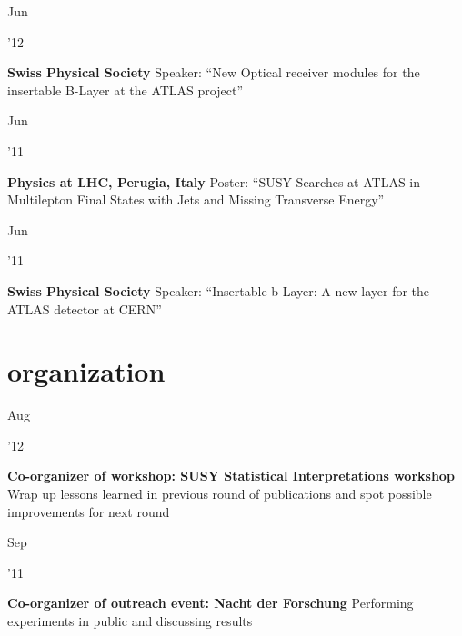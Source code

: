 \documentclass[]{cv} %
\begin{document}
\begin{entrylist}
  \entry
  {\parbox[t]{\parboxWidthOne}{Jun}\parbox[t]{\parboxWidthTwo}{\hfill '12}}
  {\textbf{Swiss Physical Society}}
  {}
  {Speaker: ``New Optical receiver modules for the insertable B-Layer at the ATLAS project''}

  \entry
  {\parbox[t]{\parboxWidthOne}{Jun}\parbox[t]{\parboxWidthTwo}{\hfill '11}}
  {\textbf{Physics at LHC, Perugia, Italy}}
  {}
  {Poster: ``SUSY Searches at ATLAS in Multilepton Final States with Jets and Missing Transverse Energy''}

  \entry
  {\parbox[t]{\parboxWidthOne}{Jun}\parbox[t]{\parboxWidthTwo}{\hfill '11}}
  {\textbf{Swiss Physical Society}}
  {}
  {Speaker: ``Insertable b-Layer: A new layer for the ATLAS detector at CERN''}

\end{entrylist}

\section{organization}

\begin{entrylist}

  \entry
  {\parbox[t]{\parboxWidthOne}{Aug}\parbox[t]{\parboxWidthTwo}{\hfill '12}}
  {\textbf{Co-organizer of workshop: SUSY Statistical Interpretations workshop}}
  {}
  {Wrap up lessons learned in previous round of publications and spot possible
  improvements for next round}

  \entry
  {\parbox[t]{\parboxWidthOne}{Sep}\parbox[t]{\parboxWidthTwo}{\hfill '11}}
  {\textbf{Co-organizer of outreach event: Nacht der Forschung}}
  {}
  {Performing experiments in public and discussing results}

\end{entrylist}

\newpage
\end{document}
